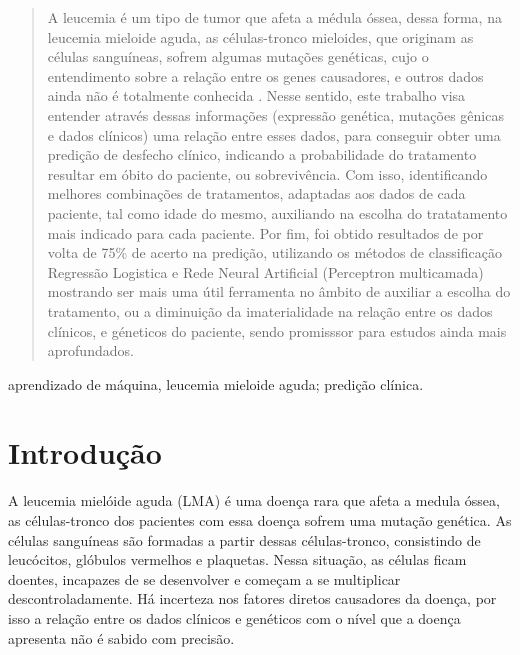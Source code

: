 \documentclass[10pt, conference, compsocconf]{IEEEtran}
\begin{document}
\begin{abstract}
A leucemia é um tipo de tumor que afeta a médula óssea, dessa forma, na leucemia mieloide aguda, as células-tronco mieloides, que originam as células sanguíneas, sofrem algumas mutações genéticas, cujo o entendimento sobre a relação entre os genes causadores, e outros dados ainda não é totalmente conhecida . Nesse sentido, este trabalho visa entender através dessas informações (expressão genética, mutações gênicas e dados clínicos) uma relação entre esses dados, para conseguir obter uma predição de desfecho clínico, indicando a probabilidade do tratamento resultar em óbito do paciente, ou sobrevivência. Com isso, identificando melhores combinações de tratamentos, adaptadas aos dados de cada paciente, tal como idade do mesmo, auxiliando na escolha do tratatamento mais indicado para cada paciente. Por fim, foi obtido resultados de por volta de 75\% de acerto na predição, utilizando os métodos de classificação Regressão Logistica e Rede Neural Artificial (Perceptron multicamada) mostrando ser mais uma útil ferramenta no âmbito de auxiliar a escolha do tratamento, ou a diminuição da imaterialidade na relação entre os dados clínicos, e géneticos do paciente, sendo promisssor para estudos ainda mais aprofundados.

\end{abstract}

\begin{IEEEkeywords}
aprendizado de máquina, leucemia mieloide aguda; predição clínica.

\end{IEEEkeywords}


%
\IEEEpeerreviewmaketitle



\section{Introdução}
\label{sec:intro}
A leucemia mielóide aguda (LMA) é uma doença rara que afeta a medula óssea, as células-tronco dos pacientes com essa doença sofrem uma mutação genética. As células sanguíneas são formadas a partir dessas células-tronco, consistindo de leucócitos, glóbulos vermelhos e plaquetas. Nessa situação, as células ficam doentes, incapazes de se desenvolver e começam a se multiplicar descontroladamente. Há incerteza nos fatores diretos causadores da doença, por isso a relação entre os dados clínicos e genéticos com o nível que a doença apresenta não é sabido com precisão. 
\end{document}
